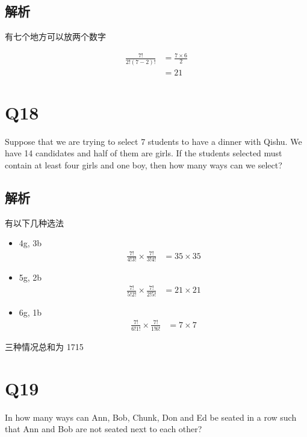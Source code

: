   \subsection{解析}

    有七个地方可以放两个数字

    \begin{align*}
      \frac{7!}{2! \left( 7 - 2 \right)!} &= \frac{7 \times 6}{2} \\
      &= 21
    \end{align*}

\section{Q18}

  Suppose that we are trying to select 7 students to have a dinner with Qishu.
  We have 14 candidates and half of them are girls. If the students selected
  must contain at least four girls and one boy, then how many ways can we
  select?

  \subsection{解析}

    有以下几种选法

    \begin{itemize}
      \item 4g, 3b
      \begin{align*}
        \frac{7!}{4!3!} \times \frac{7!}{3!4!} &= 35 \times 35
      \end{align*}

      \item 5g, 2b
      \begin{align*}
        \frac{7!}{5!2!} \times \frac{7!}{2!5!} &= 21 \times 21
      \end{align*}

      \item 6g, 1b
      \begin{align*}
        \frac{7!}{6!1!} \times \frac{7!}{1!6!} &= 7 \times 7
      \end{align*}
    \end{itemize}

    三种情况总和为 1715

\section{Q19}

  In how many ways can Ann, Bob, Chunk, Don and Ed be seated in a row such
  that Ann and Bob are not seated next to each other?

